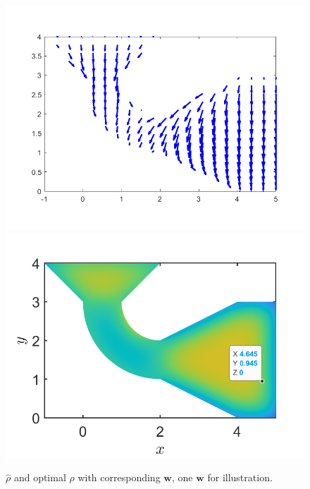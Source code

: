 \documentclass[11pt, a4paper]{article}
\theoremstyle{definition}
\newcommand{\w}{\mathbf{w}}
\newcommand{\hr}{\widehat \rho}
\begin{document}
\begin{figure}[h]
   	\includegraphics[scale=0.5]{Cont1.png}
   	\includegraphics[scale=0.5]{FWZoom.png}
   	\caption{$\hr$ and optimal $\rho$ with corresponding $\w$, one $\w$ for illustration.} 
   	\label{F2}
   \end{figure}

	
\end{document}
